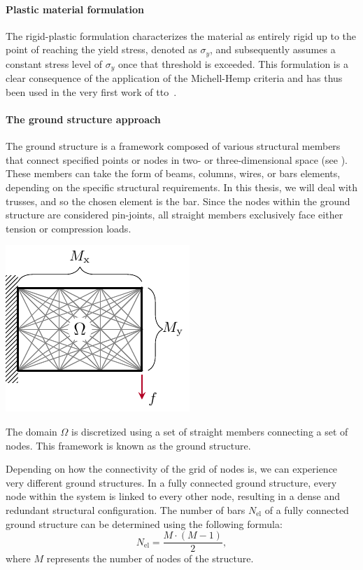 \paragraph{Plastic material formulation}
The rigid-plastic formulation characterizes the material as entirely rigid up to the point of reaching the yield stress, denoted as $\sigma_y$, and subsequently assumes a constant stress level of $\sigma_y$ once that threshold is exceeded. This formulation is a clear consequence of the application of the Michell-Hemp criteria and has thus been used in the very first work of \gls{tto}~. 

\paragraph{The ground structure approach}
The ground structure is a framework composed of various structural members that connect specified points or nodes in two- or three-dimensional space (see ). These members can take the form of beams, columns, wires, or bars elements, depending on the specific structural requirements. In this thesis, we will deal with trusses, and so the chosen element is the bar. Since the nodes within the ground structure are considered pin-joints, all straight members exclusively face either tension or compression loads. 
\begin{marginfigure}
    \centering
    \includegraphics{figures/02_literature/04_disc_mesh/d_mesh.pdf}
    \caption{The domain $\Omega$ is discretized using a set of straight members connecting a set of nodes. This framework is known as the ground structure.}
    \label{fig:02_mesh_d}
\end{marginfigure}

Depending on how the connectivity of the grid of nodes is, we can experience very different ground structures. In a fully connected ground structure, every node within the system is linked to every other node, resulting in a dense and redundant structural configuration. The number of bars $N_{\text{el}}$ of a fully connected ground structure can be determined using the following formula:
\begin{equation}
    N_{\text{el}} = \frac{M \cdot (M-1)}{2},
\end{equation}
where $M$ represents the number of nodes of the structure.

